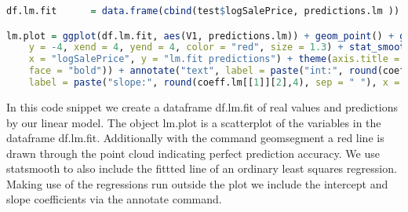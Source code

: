 \begin{lstlisting}[language=R]
df.lm.fit      = data.frame(cbind(test$logSalePrice, predictions.lm ))  # creating dataframe containing real and predicted outcome

lm.plot = ggplot(df.lm.fit, aes(V1, predictions.lm)) + geom_point() + geom_segment(x = -4, 
    y = -4, xend = 4, yend = 4, color = "red", size = 1.3) + stat_smooth(method = "lm", se = FALSE) + labs(title = "Plot of real logSalePrice against predicted values", 
    x = "logSalePrice", y = "lm.fit predictions") + theme(axis.title = element_text(size = 16), plot.title = element_text(size = 16, 
    face = "bold")) + annotate("text", label = paste("int:", round(coeff.lm[[1]][1],4), sep = " "), x = -3, y = 3) + annotate("text", 
    label = paste("slope:", round(coeff.lm[[1]][2],4), sep = " "), x = -3, y = 2.5) + theme_classic()
\end{lstlisting} 
In this code snippet we create a dataframe df.lm.fit of real values and predictions by our linear model. The object lm.plot is a scatterplot of the variables in the dataframe df.lm.fit. Additionally with the command geomsegment a red line is drawn through the point cloud indicating perfect prediction accuracy. We use statsmooth to also include the fittted line of an ordinary least squares regression. Making use of the regressions run outside the plot we include the intercept and slope coefficients via the annotate command.   
